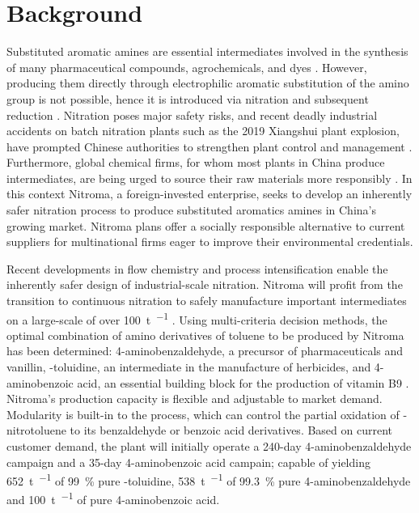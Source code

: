 \section*{Background}

Substituted aromatic amines are essential intermediates involved in the synthesis of many pharmaceutical compounds, agrochemicals, and dyes \cite{vogt_amines_2000}. However, producing them directly through electrophilic aromatic substitution of the amino group is not possible, hence it is introduced via nitration and subsequent reduction \cite{dugal_nitrobenzene_2005}. Nitration poses major safety risks, and recent deadly industrial accidents on batch nitration plants such as the 2019 Xiangshui plant explosion, have prompted Chinese authorities to strengthen plant control and management \cite{el_diario_china_2019}. Furthermore, global chemical firms, for whom most plants in China produce intermediates, are being urged to source their raw materials more responsibly \cite{stanway_global_2019}.
In this context Nitroma, a foreign-invested enterprise, seeks to develop an inherently safer nitration process to produce substituted aromatics amines in China's growing market. Nitroma plans offer a socially responsible alternative to current suppliers for multinational firms eager to improve their environmental credentials. 

Recent developments in flow chemistry and process intensification enable the inherently safer design of industrial-scale nitration. Nitroma will profit from the transition to continuous nitration to safely manufacture important intermediates on a large-scale of over \SI{100}{\tonne\per\year} \cite{di_miceli_raimondi_safety_2015}. Using multi-criteria decision methods, the optimal combination of amino derivatives of toluene to be produced by Nitroma has been determined: 4-amino\-benz\-aldehyde, a precursor of pharmaceuticals and vanillin, \ortho-toluidine, an intermediate in the manufacture of herbicides, and 4-amino\-benzoic acid, an essential building block for the production of vitamin B9 \cite{bowers_toluidines_2000,bruhne_benzaldehyde_2011,maki_benzoic_2000}.
Nitroma's production capacity is flexible and adjustable to market demand. Modularity is built-in to the process, which can control the partial oxidation of \para-nitrotoluene to its benzaldehyde or benzoic acid derivatives. Based on current customer demand, the plant will initially operate a 240-day 4-amino\-benz\-aldehyde campaign and a 35-day 4-amino\-benzoic acid campain; capable of yielding \SI{652}{\tonne\per\year} of \SI{99}{\percent} pure \ortho-toluidine, \SI{538}{\tonne\per\year} of \SI{99.3}{\percent} pure 4-amino\-benz\-aldehyde and \SI{100}{\tonne\per\year} of pure 4-amino\-benzoic acid.

